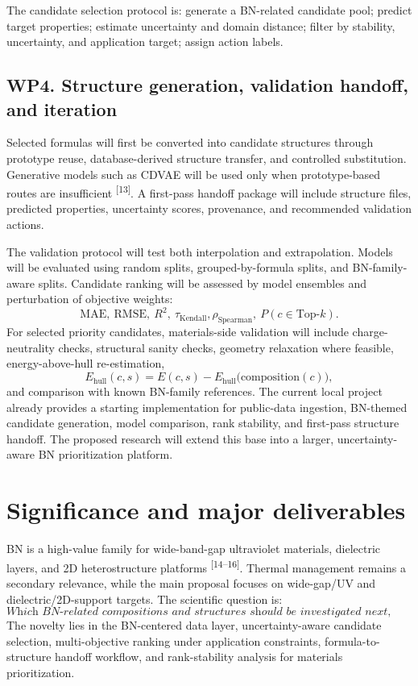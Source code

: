 \documentclass[10pt]{article}
\newcommand{\ehull}{E_{\mathrm{hull}}}
\begin{document}
The candidate selection protocol is: generate a BN-related candidate pool; predict target properties; estimate uncertainty and domain distance; filter by stability, uncertainty, and application target; assign action labels.

\subsection*{WP4. Structure generation, validation handoff, and iteration}
Selected formulas will first be converted into candidate structures through prototype reuse, database-derived structure transfer, and controlled substitution. Generative models such as CDVAE will be used only when prototype-based routes are insufficient \textsuperscript{[13]}. A first-pass handoff package will include structure files, predicted properties, uncertainty scores, provenance, and recommended validation actions.

The validation protocol will test both interpolation and extrapolation. Models will be evaluated using random splits, grouped-by-formula splits, and BN-family-aware splits. Candidate ranking will be assessed by model ensembles and perturbation of objective weights:
\[
  \mathrm{MAE},\ \mathrm{RMSE},\ R^2,\ \tau_{\mathrm{Kendall}},
  \rho_{\mathrm{Spearman}},\ P(c\in\mathrm{Top}\text{-}k).
\]
For selected priority candidates, materials-side validation will include charge-neutrality checks, structural sanity checks, geometry relaxation where feasible, energy-above-hull re-estimation,
\[
  \ehull(c,s)=E(c,s)-E_{\mathrm{hull}}\big(\mathrm{composition}(c)\big),
\]
and comparison with known BN-family references.
The current local project already provides a starting implementation for public-data ingestion, BN-themed candidate generation, model comparison, rank stability, and first-pass structure handoff. The proposed research will extend this base into a larger, uncertainty-aware BN prioritization platform.

\section*{Significance and major deliverables}
BN is a high-value family for wide-band-gap ultraviolet materials, dielectric layers, and 2D heterostructure platforms \textsuperscript{[14--16]}. Thermal management remains a secondary relevance, while the main proposal focuses on wide-gap/UV and dielectric/2D-support targets. The scientific question is:
\[
  \textit{Which BN-related compositions and structures should be investigated next, and with what level of uncertainty?}
\]
The novelty lies in the BN-centered data layer, uncertainty-aware candidate selection, multi-objective ranking under application constraints, formula-to-structure handoff workflow, and rank-stability analysis for materials prioritization.
\end{document}
